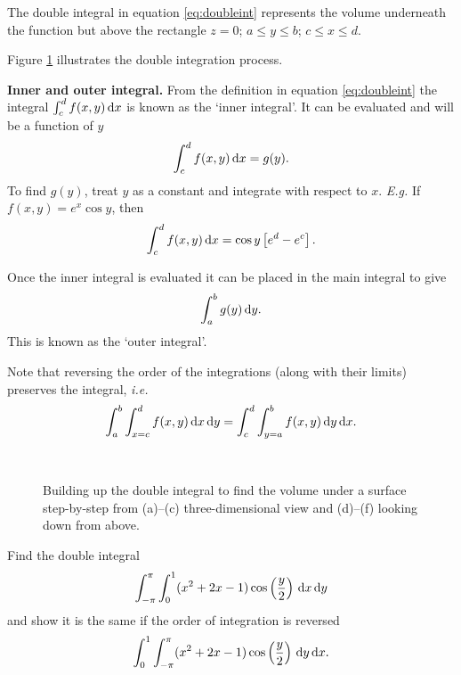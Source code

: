 The double integral in equation \eqref{eq:doubleint} represents the volume underneath the function but above the rectangle $z=0$; $a\leq y\leq b$; $c\leq x\leq d$.

Figure \ref{fig:double_integrals} illustrates the double integration process.

\textbf{Inner and outer integral.} From the definition in equation \eqref{eq:doubleint} the integral $\int_c^d f(x,y)\,{\rm d}x$
is known as the `inner integral'. It can be evaluated and will be a function of $y$
\[
\int_c^d f(x,y)\,{\rm d}x=g(y).
\]
To find $g(y)$, treat $y$ as a constant and integrate with respect to $x$. \emph{E.g.} If $f(x,y)=e^x\cos y$, then
\[
\int_c^d f(x,y)\,{\rm d}x=\cos y\left[e^d-e^c\right].
\]

Once the inner integral is evaluated it can be placed in the main integral to give
\[
\int_a^b g(y)\,{\rm d}y.
\]
This is known as the `outer integral'.

Note that reversing the order of the integrations (along with their limits) preserves the integral, \emph{i.e.}
\[
\int_a^b\int_{x=c}^d f(x,y)\,{\rm d}x\,{\rm d}y
=
\int_c^d\int_{y=a}^b f(x,y)\,{\rm d}y\,{\rm d}x.
\]

\begin{figure}[ht]
    \centering
    \hfill
    \hfill
    \\
    \hfill
    \hfill
    \caption{Building up the double integral to find the volume under a surface step-by-step from (a)--(c) three-dimensional view and (d)--(f) looking down from above.}
    \label{fig:double_integrals}
\end{figure}

\begin{example}[DIY]
Find the double integral
\[
\int_{-\pi}^{\pi}\int_0^1 (x^2+2x-1)\cos\left(\frac{y}{2}\right)\,{\rm d}x\,{\rm d}y
\]
and show it is the same if the order of integration is reversed
\[
\int_0^1\int_{-\pi}^{\pi}(x^2+2x-1)\cos\left(\frac{y}{2}\right)\,{\rm d}y\,{\rm d}x.
\]
\end{example}

